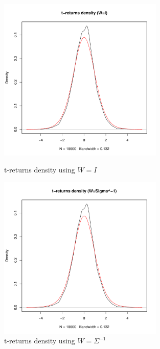 \begin{figure}\label{t-returns_density}
    \centering
    \includegraphics[width=0.7\textwidth]{t-returns_density_(W=I).pdf}
    \caption{t-returns density using $W=I$}
    \includegraphics[width=0.7\textwidth]{t-returns_density_(W=Sigma^-1).pdf}
    \caption{t-returns density using $W=\Sigma^{-1}$}
\end{figure}
